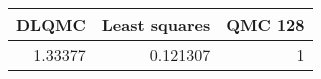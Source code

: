 \begin{tabular}{rrr}
\toprule
   DLQMC &   Least squares &   QMC 128 \\
\midrule
 1.33377 &        0.121307 &         1 \\
\bottomrule
\end{tabular}
